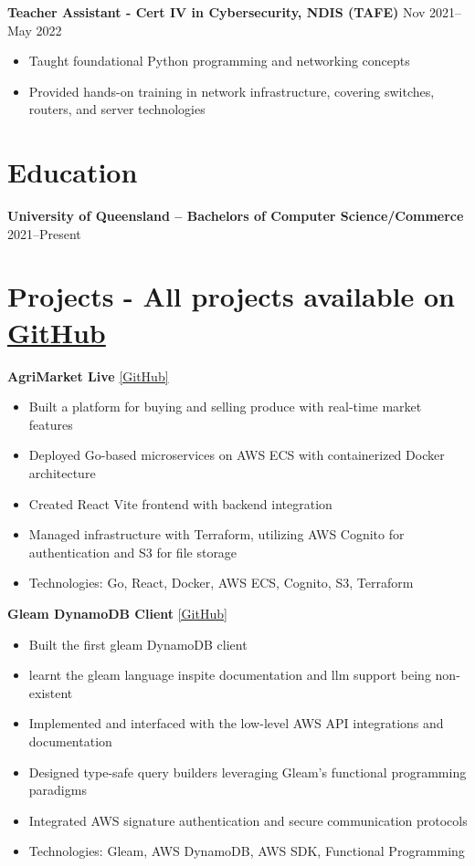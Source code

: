 \documentclass[10pt,a4paper]{article}
\begin{document}
	\textbf{Teacher Assistant - Cert IV in Cybersecurity, NDIS (TAFE)} \hfill Nov 2021--May 2022 
	\begin{itemize}[label=\textbullet, itemsep=0.02cm]
		\item Taught foundational Python programming and networking concepts
		\item Provided hands-on training in network infrastructure, covering switches, routers, and server technologies
	\end{itemize}
	
	\section{Education}
	\textbf{University of Queensland -- Bachelors of Computer Science/Commerce} \hfill 2021--Present \\	
	\section{Projects -  \textbf{All projects available on} \href{https://github.com/CameronBadman}{GitHub} }
	
	\textbf{AgriMarket Live} \href{https://github.com/CSSE6400/2025_P3_AgriMarket}{[GitHub]}
	\begin{itemize}[label=\textbullet, itemsep=0.05cm]
		\item Built a platform for buying and selling produce with real-time market features
		\item Deployed Go-based microservices on AWS ECS with containerized Docker architecture
		\item Created React Vite frontend with backend integration
		\item Managed infrastructure with Terraform, utilizing AWS Cognito for authentication and S3 for file storage
		\item Technologies: Go, React, Docker, AWS ECS, Cognito, S3, Terraform
	\end{itemize}
	
	
	\textbf{Gleam DynamoDB Client} \href{https://github.com/CameronBadman/gleam-dynamodb}{[GitHub]}
	\begin{itemize}[label=\textbullet, itemsep=0.05cm]
		\item Built the first gleam DynamoDB client
		\item learnt the gleam language inspite documentation and llm support being non-existent
		\item Implemented and interfaced with the low-level AWS API integrations and documentation
		\item Designed type-safe query builders leveraging Gleam's functional programming paradigms
		\item Integrated AWS signature authentication and secure communication protocols
		\item Technologies: Gleam, AWS DynamoDB, AWS SDK, Functional Programming
	\end{itemize}
	
\end{document}
